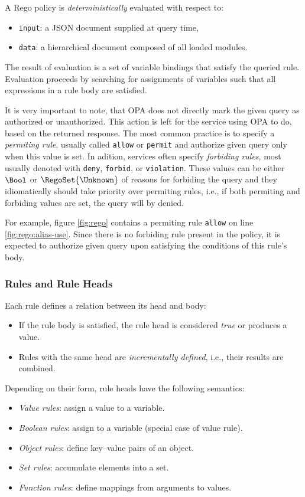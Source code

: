 A Rego policy is \emph{deterministically} evaluated with respect to:
\begin{itemize}
  \item \texttt{input}: a JSON document supplied at query time,
  \item \texttt{data}: a hierarchical document composed of all loaded modules.
\end{itemize}

The result of evaluation is a set of variable bindings that satisfy the queried rule. Evaluation proceeds by searching for assignments of variables such that all expressions in a rule body are satisfied.

It is very important to note, that OPA does not directly mark the given query as authorized or unauthorized.
This action is left for the service using OPA to do, based on the returned response.
The most common practice is to specify a \emph{permiting rule}, usually called \texttt{allow} or \texttt{permit} and authorize given query only when this value is set.
In adition, services often specify \emph{forbiding rules}, most usually denoted with \texttt{deny}, \texttt{forbid}, or \texttt{violation}.
These values can be either $\Bool$ or $\RegoSet{\Unknown}$ of reasons for forbiding the query and they idiomatically should take priority over permiting rules, i.e., if both permiting and forbiding values are set, the query will by denied.

For example, figure \ref{fig:rego} contains a permiting rule \texttt{allow} on line \ref{fig:rego:alias-use}.
Since there is no forbiding rule present in the policy, it is expected to authorize given query upon satisfying the conditions of this rule's body.

\subsubsection{Rules and Rule Heads}

Each rule defines a relation between its head and body:
\begin{itemize}
  \item If the rule body is satisfied, the rule head is considered \emph{true} or produces a value.
  \item Rules with the same head are \emph{incrementally defined}, i.e., their results are combined.
\end{itemize}

Depending on their form, rule heads have the following semantics:
\begin{itemize}
  \item \emph{Value rules}: assign a value to a variable.
  \item \emph{Boolean rules}: assign \true to a variable (special case of value rule).
  \item \emph{Object rules}: define key--value pairs of an object.
  \item \emph{Set rules}: accumulate elements into a set.
  \item \emph{Function rules}: define mappings from arguments to values.
\end{itemize}


